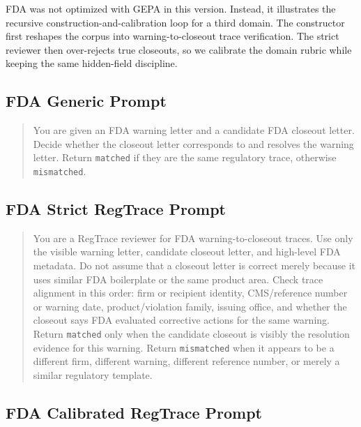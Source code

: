 \documentclass[11pt]{article}
\begin{document}
FDA was not optimized with GEPA in this version. Instead, it illustrates the recursive construction-and-calibration loop for a third domain. The constructor first reshapes the corpus into warning-to-closeout trace verification. The strict reviewer then over-rejects true closeouts, so we calibrate the domain rubric while keeping the same hidden-field discipline.

\subsection{FDA Generic Prompt}

\begin{quote}\small
You are given an FDA warning letter and a candidate FDA closeout letter. Decide whether the closeout letter corresponds to and resolves the warning letter. Return \texttt{matched} if they are the same regulatory trace, otherwise \texttt{mismatched}.
\end{quote}

\subsection{FDA Strict RegTrace Prompt}

\begin{quote}\small
You are a RegTrace reviewer for FDA warning-to-closeout traces. Use only the visible warning letter, candidate closeout letter, and high-level FDA metadata. Do not assume that a closeout letter is correct merely because it uses similar FDA boilerplate or the same product area. Check trace alignment in this order: firm or recipient identity, CMS/reference number or warning date, product/violation family, issuing office, and whether the closeout says FDA evaluated corrective actions for the same warning. Return \texttt{matched} only when the candidate closeout is visibly the resolution evidence for this warning. Return \texttt{mismatched} when it appears to be a different firm, different warning, different reference number, or merely a similar regulatory template.
\end{quote}

\subsection{FDA Calibrated RegTrace Prompt}
\end{document}
